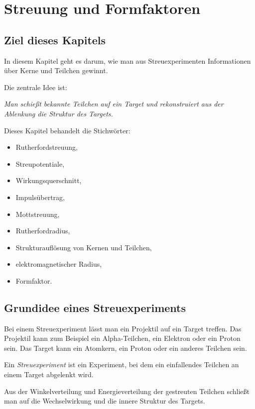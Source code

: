 \chapter{Streuung und Formfaktoren}

\section{Ziel dieses Kapitels}

In diesem Kapitel geht es darum, wie man aus Streuexperimenten Informationen über
Kerne und Teilchen gewinnt.

Die zentrale Idee ist:
\begin{center}
\emph{Man schießt bekannte Teilchen auf ein Target und rekonstruiert aus der Ablenkung
die Struktur des Targets.}
\end{center}

\begin{notebox}
Dieses Kapitel behandelt die Stichwörter:
\begin{itemize}
    \item Rutherfordstreuung,
    \item Streupotentiale,
    \item Wirkungsquerschnitt,
    \item Impulsübertrag,
    \item Mottstreuung,
    \item Rutherfordradius,
    \item Strukturauflösung von Kernen und Teilchen,
    \item elektromagnetischer Radius,
    \item Formfaktor.
\end{itemize}
\end{notebox}

\section{Grundidee eines Streuexperiments}

Bei einem Streuexperiment lässt man ein Projektil auf ein Target treffen.
Das Projektil kann zum Beispiel ein Alpha-Teilchen, ein Elektron oder ein Proton sein.
Das Target kann ein Atomkern, ein Proton oder ein anderes Teilchen sein.

\begin{definitionbox}
Ein \emph{Streuexperiment} ist ein Experiment, bei dem ein einfallendes Teilchen an
einem Target abgelenkt wird.

Aus der Winkelverteilung und Energieverteilung der gestreuten Teilchen schließt man
auf die Wechselwirkung und die innere Struktur des Targets.
\end{definitionbox}

